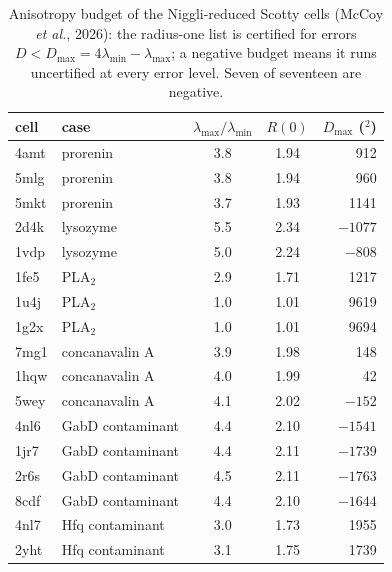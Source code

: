 \documentclass[preprint,pdf]{iucr}          %
\newcommand{\Ang}{\text{\AA}}
\begin{document}
\begin{table}
\caption{Anisotropy budget of the Niggli-reduced Scotty cells (McCoy \emph{et al.}, 2026): the radius-one list is certified for errors $D<D_{\max}=4\lambda_{\min}-\lambda_{\max}$; a negative budget means it runs uncertified at every error level. Seven of seventeen are negative.}
\label{tab:declared}
\begin{footnotesize}\begin{tabular}{llccr}
cell & case & $\lambda_{\max}/\lambda_{\min}$ & $R(0)$ & $D_{\max}$ (\Ang$^2$) \\
\hline
4amt & prorenin & 3.8 & 1.94 & 912 \\
5mlg & prorenin & 3.8 & 1.94 & 960 \\
5mkt & prorenin & 3.7 & 1.93 & 1141 \\
2d4k & lysozyme & 5.5 & 2.34 & $-1077$ \\
1vdp & lysozyme & 5.0 & 2.24 & $-808$ \\
1fe5 & PLA$_2$ & 2.9 & 1.71 & 1217 \\
1u4j & PLA$_2$ & 1.0 & 1.01 & 9619 \\
1g2x & PLA$_2$ & 1.0 & 1.01 & 9694 \\
7mg1 & concanavalin A & 3.9 & 1.98 & 148 \\
1hqw & concanavalin A & 4.0 & 1.99 & 42 \\
5wey & concanavalin A & 4.1 & 2.02 & $-152$ \\
4nl6 & GabD contaminant & 4.4 & 2.10 & $-1541$ \\
1jr7 & GabD contaminant & 4.4 & 2.11 & $-1739$ \\
2r6s & GabD contaminant & 4.5 & 2.11 & $-1763$ \\
8cdf & GabD contaminant & 4.4 & 2.10 & $-1644$ \\
4nl7 & Hfq contaminant & 3.0 & 1.73 & 1955 \\
2yht & Hfq contaminant & 3.1 & 1.75 & 1739 \\
\end{tabular}\end{footnotesize}
\end{table}
\end{document}
